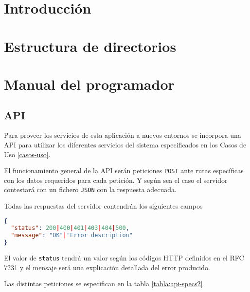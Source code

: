 
\section{Introducción}

\section{Estructura de directorios}

\section{Manual del programador}

\subsection{API}
Para proveer los servicios de esta aplicación a nuevos entornos se incorpora una API para utilizar los diferentes servicios del sistema especificados en los Casos de Uso \ref{casos-uso}.

El funcionamiento general de la API serán peticiones \texttt{POST} ante rutas específicas con los datos requeridos para cada petición. Y según sea el caso el servidor contestará con un fichero \texttt{JSON} con la respuesta adecuada.

Todas las respuestas del servidor contendrán los siguientes campos
\begin{lstlisting}[language=JSON]
{
  "status": 200|400|401|403|404|500,
  "message": "OK"|"Error description"
}
\end{lstlisting}

El valor de \texttt{status} tendrá un valor según los códigos HTTP definidos en el RFC 7231 y el mensaje será una explicación detallada del error producido.

Las distintas peticiones se especifican en la tabla \ref{tabla:api-specs2}
%			
%			

